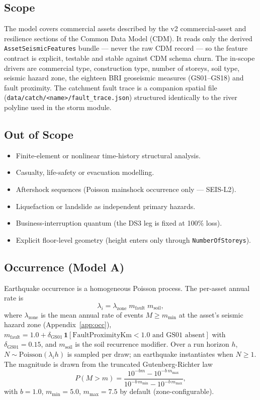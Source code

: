 \documentclass[11pt,a4paper]{article}
\begin{document}
\subsection{Scope}
The model covers commercial assets described by the v2 commercial-asset and
resilience sections of the Common Data Model (CDM). It reads only the derived
\texttt{AssetSeismicFeatures} bundle --- never the raw CDM record --- so the
feature contract is explicit, testable and stable against CDM schema churn. The
in-scope drivers are commercial type, construction type, number of storeys, soil
type, seismic hazard zone, the eighteen BRI geoseismic measures (GS01--GS18) and
fault proximity. The catchment fault trace is a companion spatial file
(\texttt{data/catch/<name>/fault\_trace.json}) structured identically to the
river polyline used in the storm module.

\subsection{Out of Scope}
\begin{itemize}
  \item Finite-element or nonlinear time-history structural analysis.
  \item Casualty, life-safety or evacuation modelling.
  \item Aftershock sequences (Poisson mainshock occurrence only --- SEIS-L2).
  \item Liquefaction or landslide as independent primary hazards.
  \item Business-interruption quantum (the DS3 leg is fixed at 100\% loss).
  \item Explicit floor-level geometry (height enters only through
        \texttt{NumberOfStoreys}).
\end{itemize}

\mkmframework

\subsection{Occurrence (Model A)}
Earthquake occurrence is a homogeneous Poisson process. The per-asset annual
rate is
\[
  \lambda_i = \lambda_{\text{zone}}\; m_{\text{fault}}\; m_{\text{soil}},
\]
where $\lambda_{\text{zone}}$ is the mean annual rate of events $M \ge m_{\min}$
at the asset's seismic hazard zone (Appendix~\ref{app:occ}), $m_{\text{fault}} =
1.0 + \delta_{\text{GS01}}\,\mathbf{1}[\text{FaultProximityKm} < 1.0 \text{ and
GS01 absent}]$ with $\delta_{\text{GS01}} = 0.15$, and $m_{\text{soil}}$ is the
soil recurrence modifier. Over a run horizon $h$, $N \sim \text{Poisson}(\lambda_i
h)$ is sampled per draw; an earthquake instantiates when $N \ge 1$. The magnitude
is drawn from the truncated Gutenberg-Richter law
\[
  P(M > m) = \frac{10^{-b m} - 10^{-b\, m_{\max}}}
                  {10^{-b\, m_{\min}} - 10^{-b\, m_{\max}}},
\]
with $b = 1.0$, $m_{\min} = 5.0$, $m_{\max} = 7.5$ by default (zone-configurable).
\end{document}
